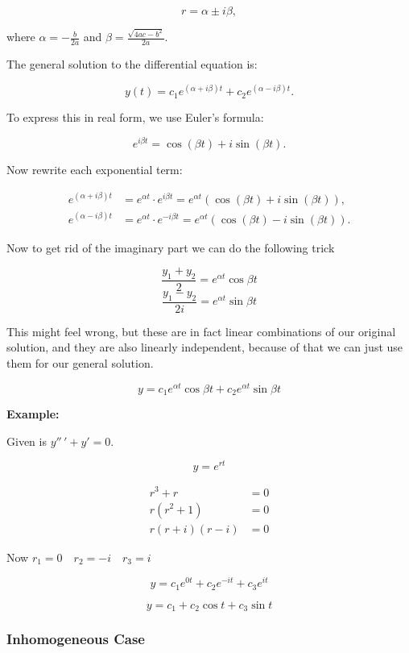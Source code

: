 \[
    r = \alpha \pm i\beta,
\]

where \( \alpha = -\frac{b}{2a} \) and \( \beta = \frac{\sqrt{4ac - b^2}}{2a} \).

The general solution to the differential equation is:

\[
    y(t) = c_1 e^{(\alpha + i\beta)t} + c_2 e^{(\alpha - i\beta)t}.
\]

To express this in real form, we use Euler’s formula:

\[
    e^{i\beta t} = \cos(\beta t) + i\sin(\beta t).
\]

Now rewrite each exponential term:

\begin{align*}
    e^{(\alpha + i\beta)t} &= e^{\alpha t} \cdot e^{i\beta t} = e^{\alpha t} (\cos(\beta t) + i \sin(\beta t)), \\
    e^{(\alpha - i\beta)t} &= e^{\alpha t} \cdot e^{-i\beta t} = e^{\alpha t} (\cos(\beta t) - i \sin(\beta t)).
\end{align*}

Now to get rid of the imaginary part we can do the following trick

\[
    \frac{y_1 + y_2}{2} = e^{\alpha t}\cos\beta t
\]
\[
    \frac{y_1 - y_2}{2i} = e^{\alpha t}\sin\beta t
\]

This might feel wrong, but these are in fact linear combinations of our original solution,
and they are also linearly independent, because of that we can just use them for our general solution.

\[y = c_1 e^{\alpha t}\cos\beta t + c_2  e^{\alpha t}\sin\beta t\]

\textbf{Example:}

Given is \(y''\,' + y' = 0\).

\[
    y = e^{rt}
\]

\begin{align*}
r^3 + r &= 0\\
r(r^2 + 1) &= 0\\
r(r + i)(r - i) &= 0
\end{align*}

Now \(r_1 = 0 \quad r_2 = -i \quad r_3 = i\)

\[
    y = c_1 e^{0t} + c_2 e^{-it} + c_3 e^{it}
\]

\[
    y = c_1 + c_2 \cos t + c_3 \sin t
\]

\subsubsection{Inhomogeneous Case}

